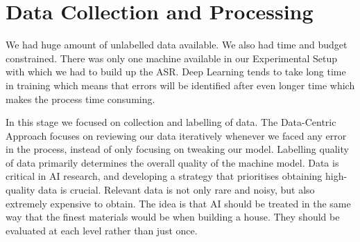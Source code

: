 \newpage


\section{Data Collection and Processing}
\label{sec:Data_preprocessing}

We had huge amount of unlabelled data available. We also had time and budget constrained. There was only one machine available in our Experimental Setup with which we had to build up the ASR. Deep Learning tends to take long time in training which means that errors will be identified after even longer time which makes the process time consuming. 


In this stage we focused on collection and labelling of data. The Data-Centric Approach \cite{patel_data-centric_2021} focuses on reviewing our data iteratively whenever we faced any error in the process, instead of only focusing on tweaking our model. Labelling quality of data primarily determines the overall quality of the machine model. Data is critical in AI research, and developing a strategy that prioritises obtaining high-quality data is crucial. Relevant data is not only rare and noisy, but also extremely expensive to obtain. The idea is that AI should be treated in the same way that the finest materials would be when building a house. They should be evaluated at each level rather than just once.

